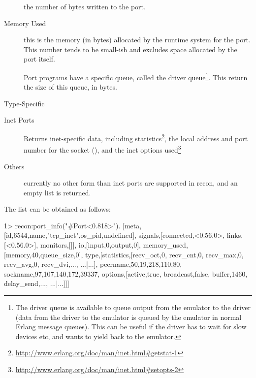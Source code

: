 \documentclass[11pt, oneside]{book}   	%
\begin{document}
\begin{description*}
\begin{description}
			\item[] the number of bytes written to the port.
		\end{description}

	\item[Memory Used] \hfill
		\begin{description}		
			\item[] this is the memory (in bytes) allocated by the runtime system for the port. This number tends to be small-ish and excludes space allocated by the port itself.
			
			\item[] Port programs have a specific queue, called the driver queue\footnote{The driver queue is available to queue output from the emulator to the driver (data from the driver to the emulator is queued by the emulator in normal Erlang message queues). This can be useful if the driver has to wait for slow devices etc, and wants to yield back to the emulator.}. This return the size of this queue, in bytes.
		\end{description}
		
	\item[Type-Specific] \hfill
		\begin{description}		
			\item[Inet Ports] Returns inet-specific data, including statistics\footnote{\href{http://www.erlang.org/doc/man/inet.html\#getstat-1}{http://www.erlang.org/doc/man/inet.html\#getstat-1}}, the local address and port number for the socket (), and the inet options used\footnote{\href{http://www.erlang.org/doc/man/inet.html\#setopts-2}{http://www.erlang.org/doc/man/inet.html\#setopts-2}}
			\item[Others] currently no other form than inet ports are supported in recon, and an empty list is returned.
		\end{description}
\end{description*}
		
The list can be obtained as follows:

\begin{VerbatimEshell}
1> recon:port_info("#Port<0.818>").
[{meta,[{id,6544},{name,"tcp_inet"},{os_pid,undefined}]},
 {signals,[{connected,<0.56.0>},
           {links,[<0.56.0>]},
           {monitors,[]}]},
 {io,[{input,0},{output,0}]},
 {memory_used,[{memory,40},{queue_size,0}]},
 {type,[{statistics,[{recv_oct,0},
                     {recv_cnt,0},
                     {recv_max,0},
                     {recv_avg,0},
                     {recv_dvi,...},
                     {...}|...]},
        {peername,{{50,19,218,110},80}},
        {sockname,{{97,107,140,172},39337}},
        {options,[{active,true},
                  {broadcast,false},
                  {buffer,1460},
                  {delay_send,...},
                  {...}|...]}]}]
\end{VerbatimEshell}
		
\end{document}
